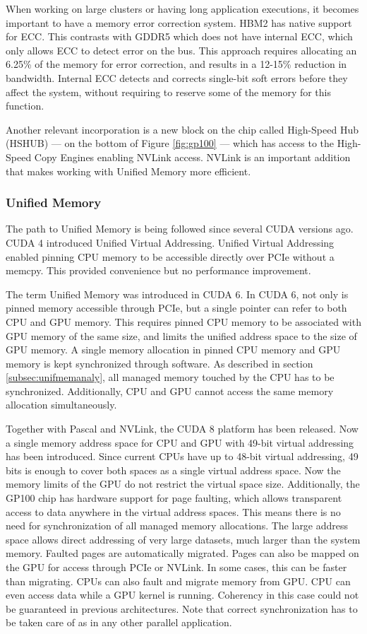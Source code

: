 When working on large clusters or having long application executions, it becomes important to have a memory error correction system.
HBM2 has native support for ECC.
This contrasts with GDDR5 which does not have internal ECC, which only allows ECC to detect error on the bus.
This approach requires allocating an 6.25\% of the memory for error correction, and results in a 12-15\% reduction in bandwidth.
Internal ECC detects and corrects single-bit soft errors before they affect the system, without requiring to reserve some of the memory for this function.

Another relevant incorporation is a new block on the chip called High-Speed Hub (HSHUB) --- on the bottom of Figure \ref{fig:gp100} --- which has access to the High-Speed Copy Engines enabling NVLink access.
NVLink is an important addition that makes working with Unified Memory more efficient.

\subsubsection{Unified Memory}
The path to Unified Memory is being followed since several CUDA versions ago.
CUDA 4 introduced Unified Virtual Addressing.
Unified Virtual Addressing enabled pinning CPU memory to be accessible directly over PCIe without a memcpy.
This provided convenience but no performance improvement.

The term Unified Memory was introduced in CUDA 6.
In CUDA 6, not only is pinned memory accessible through PCIe, but a single pointer can refer to both CPU and GPU memory.
This requires pinned CPU memory to be associated with GPU memory of the same size, and limits the unified address space to the size of GPU memory.
A single memory allocation in pinned CPU memory and GPU memory is kept synchronized through software.
As described in section \ref{subsec:unifmemanaly}, all managed memory touched by the CPU has to be synchronized.
Additionally, CPU and GPU cannot access the same memory allocation simultaneously.

Together with Pascal and NVLink, the CUDA 8 platform has been released.
Now a single memory address space for CPU and GPU with 49-bit virtual addressing has been introduced.
Since current CPUs have up to 48-bit virtual addressing, 49 bits is enough to cover both spaces as a single virtual address space.
Now the memory limits of the GPU do not restrict the virtual space size.
Additionally, the GP100 chip has hardware support for page faulting, which allows transparent access to data anywhere in the virtual address spaces.
This means there is no need for synchronization of all managed memory allocations.
The large address space allows direct addressing of very large datasets, much larger than the system memory.
Faulted pages are automatically migrated.
Pages can also be mapped on the GPU for access through PCIe or NVLink.
In some cases, this can be faster than migrating.
CPUs can also fault and migrate memory from GPU.
CPU can even access data while a GPU kernel is running.
Coherency in this case could not be guaranteed in previous architectures.
Note that correct synchronization has to be taken care of as in any other parallel application.

